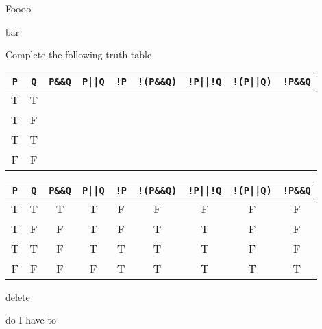 \documentclass[10pt,answers,addpoints]{exam}
\begin{document}
\begin{questions}
\par\vspace{0.100000in}\begin{minipage}{\linewidth}
\question[10]

Foooo

\begin{solutionbox}{3in}

bar
\end{solutionbox}
\end{minipage}


\par\vspace{0.100000in}\begin{minipage}{\linewidth}
\question[14]

Complete the following truth table
\begin{center}
\begin{tabular}{ | c | c | c | c | c | c | c | c | c |}
\hline

\verb#P#&\verb#Q#&\verb#P&&Q#&\verb#P||Q#&\verb#!P#&
\verb#!(P&&Q)#&\verb#!P||!Q#&\verb#!(P||Q)#&\verb#!P&&Q# \\ \hline
T&T& & & & & & &  \\ \hline
T&F& & & & & & &  \\ \hline
T&T& & & & & & &  \\ \hline
F&F& & & & & & &  \\ \hline
\end{tabular}
\end{center}

\begin{solutionbox}{0in}

\begin{center}
\begin{tabular}{ | c | c | c | c | c | c | c | c | c |}
\hline
\verb#P#&\verb#Q#&\verb#P&&Q#&\verb#P||Q#&\verb#!P#&
\verb#!(P&&Q)#&\verb#!P||!Q#&\verb#!(P||Q)#&\verb#!P&&Q# \\ \hline
T&T&T&T&F&F&F&F&F \\ \hline
T&F&F&T&F&T&T&F&F \\ \hline
T&T&F&T&T&T&T&F&F \\ \hline
F&F&F&F&T&T&T&T&T \\ \hline
\end{tabular}
\end{center}

\end{solutionbox}
\end{minipage}


\par\vspace{0.100000in}\begin{minipage}{\linewidth}
\question[20]
delete
\begin{solutionbox}{3in}
do I have to
\end{solutionbox}
\end{minipage}



\end{questions}
\end{document}
